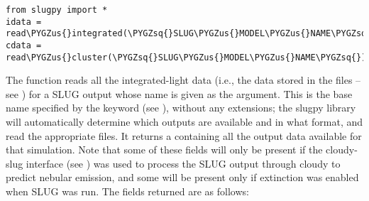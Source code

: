 \documentclass[letterpaper,10pt,english]{sphinxmanual}
\def\PYGZus{\char`\_}
\def\PYGZsq{\char`\'}
\renewcommand\PYGZsq{\textquotesingle}
\begin{document}
\begin{Verbatim}[commandchars=\\\{\}]
from slugpy import *
idata = read\PYGZus{}integrated(\PYGZsq{}SLUG\PYGZus{}MODEL\PYGZus{}NAME\PYGZsq{})
cdata = read\PYGZus{}cluster(\PYGZsq{}SLUG\PYGZus{}MODEL\PYGZus{}NAME\PYGZsq{})
\end{Verbatim}

The  function reads all the integrated-light data (i.e., the data stored in the  files -- see {\hyperref[output:sec-output]{\emph{}}}) for a SLUG output whose name is given as the argument. This is the base name specified by the  keyword (see {\hyperref[parameters:ssec-basic-keywords]{\emph{}}}), without any extensions; the slugpy library will automatically determine which outputs are available and in what format, and read the appropriate files. It returns a  containing all the output data available for that simulation. Note that some of these fields will only be present if the cloudy-slug interface (see {\hyperref[cloudy:sec-cloudy-slug]{\emph{}}}) was used to process the SLUG output through cloudy to predict nebular emission, and some will be present only if extinction was enabled when SLUG was run. The fields returned are as follows:
\end{document}
